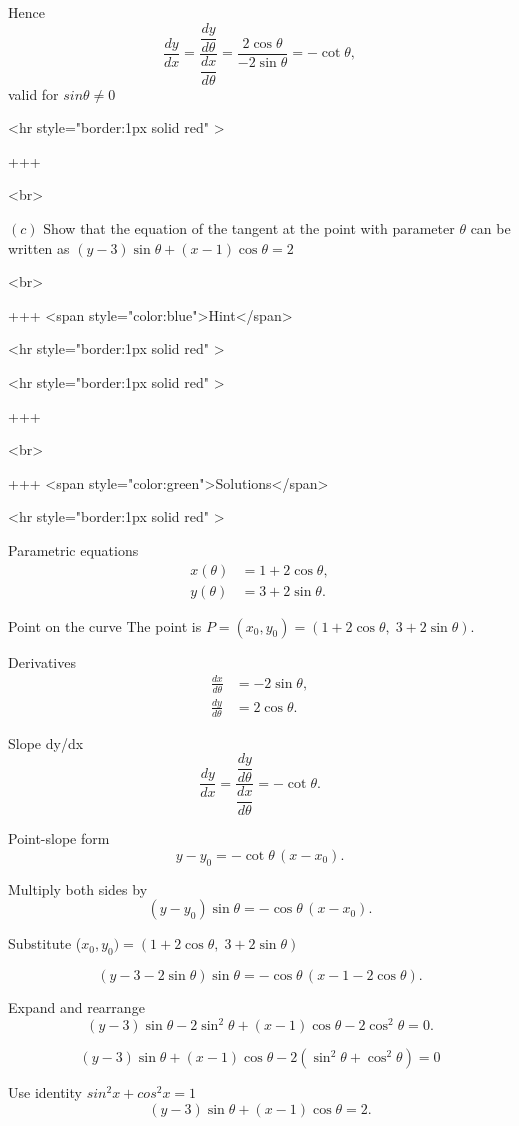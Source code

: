 Hence
$$
\frac{dy}{dx}=\frac{\dfrac{dy}{d\theta}}{\dfrac{dx}{d\theta}}=\frac{2\cos\theta}{-2\sin\theta}=-\cot\theta,
$$
valid for $sinθ \neq 0$

<hr style="border:1px solid red" >

+++

<br>

\((c)\) Show that the equation of the tangent at the point with parameter $\theta$ can be written as $(y-3) \sin \theta+(x-1) \cos \theta=2$

<br>

+++ <span style="color:blue">Hint</span>

<hr style="border:1px solid red" >

<hr style="border:1px solid red" >

+++

<br>

+++ <span style="color:green">Solutions</span>

<hr style="border:1px solid red" >

Parametric equations
\begin{align*}
x(\theta) &= 1 + 2\cos\theta,\\
y(\theta) &= 3 + 2\sin\theta.
\end{align*}

Point on the curve
The point is $P=(x_0,y_0)=(1+2\cos\theta,\;3+2\sin\theta)$.

Derivatives
\begin{align*}
\frac{dx}{d\theta} &= -2\sin\theta,\\
\frac{dy}{d\theta} &= 2\cos\theta.
\end{align*}

Slope dy/dx
$$
\frac{dy}{dx} = \frac{\dfrac{dy}{d\theta}}{\dfrac{dx}{d\theta}} = -\cot\theta.
$$


Point-slope form
$$
y - y_0 = -\cot\theta\,(x-x_0).
$$

Multiply both sides by \sin\theta
$$
(y-y_0)\sin\theta = -\cos\theta\,(x-x_0).
$$

Substitute ($x_0,y_0)=(1+2\cos\theta,\;3+2\sin\theta)$

$$
(y-3-2\sin\theta)\sin\theta = -\cos\theta\,(x-1-2\cos\theta).
$$


Expand and rearrange
$$
(y-3)\sin\theta - 2\sin^2\theta + (x-1)\cos\theta - 2\cos^2\theta = 0.
$$

$$
(y-3)\sin\theta + (x-1)\cos\theta - 2(\sin^2\theta+\cos^2\theta) = 0
$$

Use identity $sin^2x+cos^2x=1$
$$
(y-3)\sin\theta + (x-1)\cos\theta = 2.
$$

